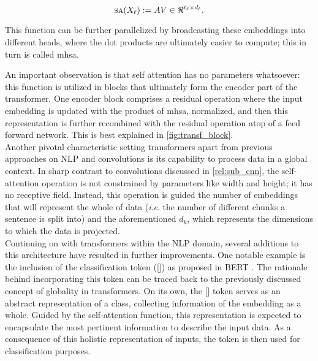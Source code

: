 \begin{equation}
	\sa(X_\ell) \defn A V \in \real^{t_\ell \times d_\ell}.
\label{eq:SA}
\end{equation}

This function can be further parallelized by broadcasting these embeddings into different 
heads, where the dot products are ultimately easier to compute; this in turn is called \gls{mhsa}.

An important observation is that self attention has no parameters whatsoever: this function is 
utilized in blocks that ultimately form the encoder part of the transformer. One encoder block 
comprises a residual operation where the input embedding is updated with the product of \gls{mhsa}, 
normalized, and then this representation is further recombined with the residual operation atop of 
a feed forward network. This is best explained in \autoref{fig:transf_block}.\\



\noindent Another pivotal characteristic setting transformers apart from previous approaches on NLP 
and convolutions is its capability to process data in a global context. In sharp contrast to 
convolutions discussed in \autoref{rel:sub_cnn}, the self-attention operation is not constrained by 
parameters like width and height; it has no receptive field. Instead, this operation is guided 
the number of embeddings that will represent the whole of data (\textit{i}.\textit{e}. the number 
of different chunks a sentence is split into) and the aforementioned $d_k$, which represents the 
dimensions to which the data is projected. \\

\noindent Continuing on with transformers within the NLP domain, several additions 
to this architecture have resulted in further improvements. One notable example is the inclusion of 
the classification token ([]) as proposed in BERT \autocite{devlin2018bert}. The rationale 
behind incorporating this token can be traced back to the previously discussed concept of globality 
in transformers. On its own, the [] token serves as an abstract representation of a 
class, collecting information of the embedding as a whole. Guided by the 
self-attention function, this representation is expected to encapsulate the most pertinent 
information to describe the input data. As a consequence of this holistic representation of inputs, 
the token is then used for classification purposes.\\

